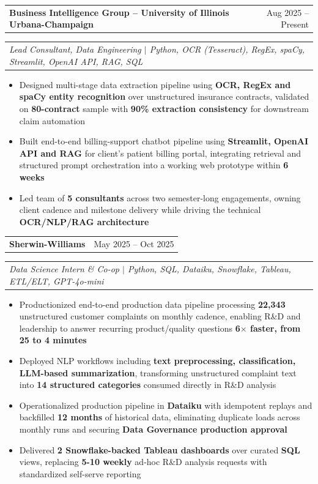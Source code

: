 \documentclass[letterpaper,10pt]{article}
\makeatletter
\newcommand{\resumeItem}[1]{
  \item\small{
    {#1 \vspace{-2pt}}
  }
}
\newcommand{\resumeSubheading}[3]{
  \vspace{-2pt}\item
    \begin{tabular*}{0.97\textwidth}[t]{l@{\extracolsep{\fill}}r}
      \textbf{#1} & #2 \\
    \end{tabular*}
    \vspace{-3pt}
    \begin{tabular*}{0.97\textwidth}[t]{@{}l@{}}
      \textit{\small#3}
    \end{tabular*}\vspace{-3pt}
}
\newcommand{\resumeItemListStart}{\begin{itemize}}
\newcommand{\resumeItemListEnd}{\end{itemize}\vspace{-5pt}}
\makeatother
\begin{document}
    \resumeSubheading
      {Business Intelligence Group -- University of Illinois Urbana-Champaign}{Aug 2025 -- Present}
      {Lead Consultant, Data Engineering $|$ Python, OCR (Tesseract), RegEx, spaCy, Streamlit, OpenAI API, RAG, SQL}
      \resumeItemListStart
        \resumeItem{Designed multi-stage data extraction pipeline using \textbf{OCR, RegEx and spaCy entity recognition} over unstructured insurance contracts, validated on \textbf{80-contract} sample with \textbf{90\% extraction consistency} for downstream claim automation}
        \resumeItem{Built end-to-end billing-support chatbot pipeline using \textbf{Streamlit, OpenAI API and RAG} for client's patient billing portal, integrating retrieval and structured prompt orchestration into a working web prototype within \textbf{6 weeks}}
        \resumeItem{Led team of \textbf{5 consultants} across two semester-long engagements, owning client cadence and milestone delivery while driving the technical \textbf{OCR/NLP/RAG architecture}}
      \resumeItemListEnd

    \resumeSubheading
      {Sherwin-Williams}{May 2025 -- Oct 2025}
      {Data Science Intern \& Co-op $|$ Python, SQL, Dataiku, Snowflake, Tableau, ETL/ELT, GPT-4o-mini}
      \resumeItemListStart
        \resumeItem{Productionized end-to-end production data pipeline processing \textbf{22,343} unstructured customer complaints on monthly cadence, enabling R\&D and leadership to answer recurring product/quality questions \textbf{6$\times$ faster, from 25 to 4 minutes}}
        \resumeItem{Deployed NLP workflows including \textbf{text preprocessing, classification, LLM-based summarization}, transforming unstructured complaint text into \textbf{14 structured categories} consumed directly in R\&D analysis}
        \resumeItem{Operationalized production pipeline in \textbf{Dataiku} with idempotent replays and backfilled \textbf{12 months} of historical data, eliminating duplicate loads across monthly runs and securing \textbf{Data Governance production approval}}
        \resumeItem{Delivered \textbf{2 Snowflake-backed Tableau dashboards} over curated \textbf{SQL} views, replacing \textbf{5-10 weekly} ad-hoc R\&D analysis requests with standardized self-serve reporting}
      \resumeItemListEnd
\end{document}
